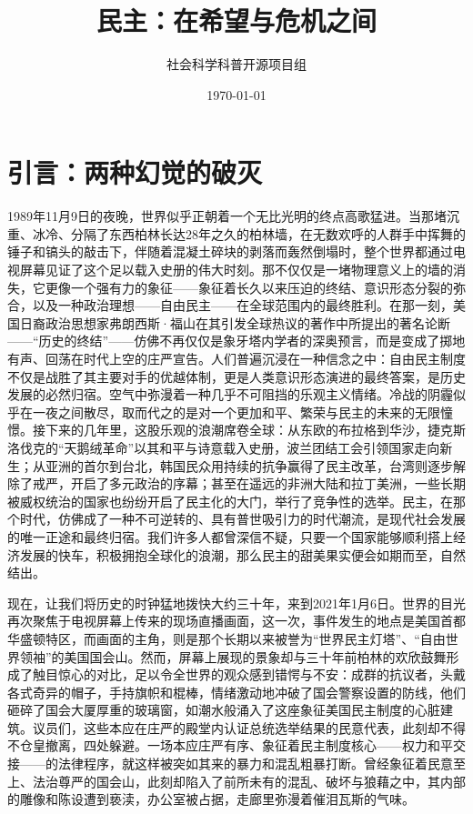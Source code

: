 \documentclass[UTF8, 10pt]{ctexbook}
\title{民主：在希望与危机之间}
\author{社会科学科普开源项目组}
\date{\today}
\begin{document}
\frontmatter

\maketitle
\tableofcontents

\chapter{引言：两种幻觉的破灭}

\lettrine[lines=3]{1}{989}年11月9日的夜晚，世界似乎正朝着一个无比光明的终点高歌猛进。当那堵沉重、冰冷、分隔了东西柏林长达28年之久的柏林墙，在无数欢呼的人群手中挥舞的锤子和镐头的敲击下，伴随着混凝土碎块的剥落而轰然倒塌时，整个世界都通过电视屏幕见证了这个足以载入史册的伟大时刻。那不仅仅是一堵物理意义上的墙的消失，它更像一个强有力的象征——象征着长久以来压迫的终结、意识形态分裂的弥合，以及一种政治理想——自由民主——在全球范围内的最终胜利。在那一刻，美国日裔政治思想家弗朗西斯·福山在其引发全球热议的著作中所提出的著名论断——“历史的终结”——仿佛不再仅仅是象牙塔内学者的深奥预言，而是变成了掷地有声、回荡在时代上空的庄严宣告。人们普遍沉浸在一种信念之中：自由民主制度不仅是战胜了其主要对手的优越体制，更是人类意识形态演进的最终答案，是历史发展的必然归宿。空气中弥漫着一种几乎不可阻挡的乐观主义情绪。冷战的阴霾似乎在一夜之间散尽，取而代之的是对一个更加和平、繁荣与民主的未来的无限憧憬。接下来的几年里，这股乐观的浪潮席卷全球：从东欧的布拉格到华沙，捷克斯洛伐克的“天鹅绒革命”以其和平与诗意载入史册，波兰团结工会引领国家走向新生；从亚洲的首尔到台北，韩国民众用持续的抗争赢得了民主改革，台湾则逐步解除了戒严，开启了多元政治的序幕；甚至在遥远的非洲大陆和拉丁美洲，一些长期被威权统治的国家也纷纷开启了民主化的大门，举行了竞争性的选举。民主，在那个时代，仿佛成了一种不可逆转的、具有普世吸引力的时代潮流，是现代社会发展的唯一正途和最终归宿。我们许多人都曾深信不疑，只要一个国家能够顺利搭上经济发展的快车，积极拥抱全球化的浪潮，那么民主的甜美果实便会如期而至，自然结出。

现在，让我们将历史的时钟猛地拨快大约三十年，来到2021年1月6日。世界的目光再次聚焦于电视屏幕上传来的现场直播画面，这一次，事件发生的地点是美国首都华盛顿特区，而画面的主角，则是那个长期以来被誉为“世界民主灯塔”、“自由世界领袖”的美国国会山。然而，屏幕上展现的景象却与三十年前柏林的欢欣鼓舞形成了触目惊心的对比，足以令全世界的观众感到错愕与不安：成群的抗议者，头戴各式奇异的帽子，手持旗帜和棍棒，情绪激动地冲破了国会警察设置的防线，他们砸碎了国会大厦厚重的玻璃窗，如潮水般涌入了这座象征美国民主制度的心脏建筑。议员们，这些本应在庄严的殿堂内认证总统选举结果的民意代表，此刻却不得不仓皇撤离，四处躲避。一场本应庄严有序、象征着民主制度核心——权力和平交接——的法律程序，就这样被突如其来的暴力和混乱粗暴打断。曾经象征着民意至上、法治尊严的国会山，此刻却陷入了前所未有的混乱、破坏与狼藉之中，其内部的雕像和陈设遭到亵渎，办公室被占据，走廊里弥漫着催泪瓦斯的气味。
\end{document}
